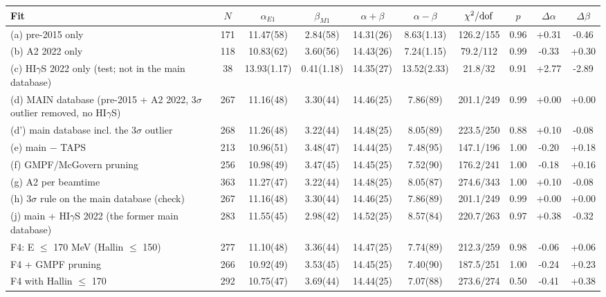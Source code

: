 \begin{tabular}{lccccccccc}
\hline
Fit & $N$ & $\alpha_{E1}$ & $\beta_{M1}$ & $\alpha+\beta$ & $\alpha-\beta$ & $\chi^2/{\rm dof}$ & $p$ & $\Delta\alpha$ & $\Delta\beta$ \\
\hline
(a) pre-2015 only & 171 & 11.47(58) & 2.84(58) & 14.31(26) & 8.63(1.13) & 126.2/155 & 0.96 & +0.31 & -0.46 \\
(b) A2 2022 only & 118 & 10.83(62) & 3.60(56) & 14.43(26) & 7.24(1.15) & 79.2/112 & 0.99 & -0.33 & +0.30 \\
(c) HI$\gamma$S 2022 only (test; not in the main database) & 38 & 13.93(1.17) & 0.41(1.18) & 14.35(27) & 13.52(2.33) & 21.8/32 & 0.91 & +2.77 & -2.89 \\
(d) MAIN database (pre-2015 + A2 2022, 3$\sigma$ outlier removed, no HI$\gamma$S) & 267 & 11.16(48) & 3.30(44) & 14.46(25) & 7.86(89) & 201.1/249 & 0.99 & +0.00 & +0.00 \\
(d') main database incl. the 3$\sigma$ outlier & 268 & 11.26(48) & 3.22(44) & 14.48(25) & 8.05(89) & 223.5/250 & 0.88 & +0.10 & -0.08 \\
(e) main $-$ TAPS & 213 & 10.96(51) & 3.48(47) & 14.44(25) & 7.48(95) & 147.1/196 & 1.00 & -0.20 & +0.18 \\
(f) GMPF/McGovern pruning & 256 & 10.98(49) & 3.47(45) & 14.45(25) & 7.52(90) & 176.2/241 & 1.00 & -0.18 & +0.16 \\
(g) A2 per beamtime & 363 & 11.27(47) & 3.22(44) & 14.48(25) & 8.05(87) & 274.6/343 & 1.00 & +0.10 & -0.08 \\
(h) 3$\sigma$ rule on the main database (check) & 267 & 11.16(48) & 3.30(44) & 14.46(25) & 7.86(89) & 201.1/249 & 0.99 & +0.00 & +0.00 \\
(j) main + HI$\gamma$S 2022 (the former main database) & 283 & 11.55(45) & 2.98(42) & 14.52(25) & 8.57(84) & 220.7/263 & 0.97 & +0.38 & -0.32 \\
F4: E $\le$ 170 MeV (Hallin $\le$ 150) & 277 & 11.10(48) & 3.36(44) & 14.47(25) & 7.74(89) & 212.3/259 & 0.98 & -0.06 & +0.06 \\
F4 + GMPF pruning & 266 & 10.92(49) & 3.53(45) & 14.45(25) & 7.40(90) & 187.5/251 & 1.00 & -0.24 & +0.23 \\
F4 with Hallin $\le$ 170 & 292 & 10.75(47) & 3.69(44) & 14.44(25) & 7.07(88) & 273.6/274 & 0.50 & -0.41 & +0.38 \\
\hline
\end{tabular}

